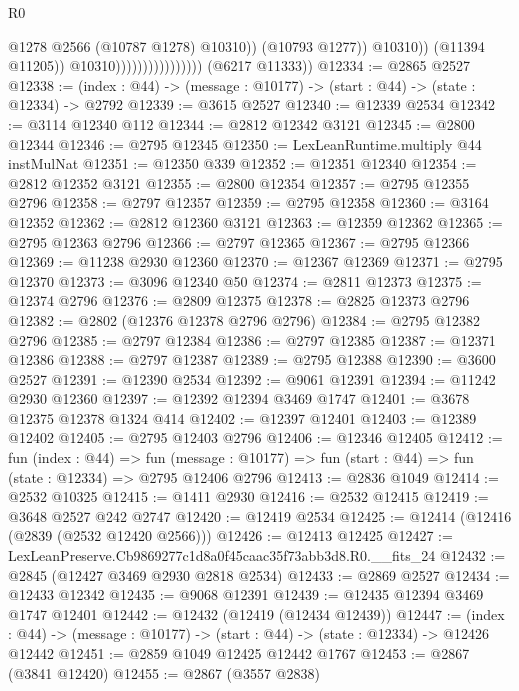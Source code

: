 \begin{lexlean}{R0}
\begin{coremodule}
                                                  @1278
                                                  @2566
                                                  (@10787 @1278)
                                                  @10310))
                                              (@10793 @1277))
                                            @10310))
                                        (@11394 @11205))
                                      @10310))))))))))))))))
      (@6217 @11333))
@12334 := @2865 @2527
@12338 := (index : @44) -> (message : @10177) -> (start : @44) -> (state : @12334) -> @2792
@12339 := @3615 @2527
@12340 := @12339 @2534
@12342 := @3114 @12340 @112
@12344 := @2812 @12342 @3121
@12345 := @2800 @12344
@12346 := @2795 @12345
@12350 := LexLeanRuntime.multiply @44 instMulNat
@12351 := @12350 @339
@12352 := @12351 @12340
@12354 := @2812 @12352 @3121
@12355 := @2800 @12354
@12357 := @2795 @12355 @2796
@12358 := @2797 @12357
@12359 := @2795 @12358
@12360 := @3164 @12352
@12362 := @2812 @12360 @3121
@12363 := @12359 @12362
@12365 := @2795 @12363 @2796
@12366 := @2797 @12365
@12367 := @2795 @12366
@12369 := @11238 @2930 @12360
@12370 := @12367 @12369
@12371 := @2795 @12370
@12373 := @3096 @12340 @50
@12374 := @2811 @12373
@12375 := @12374 @2796
@12376 := @2809 @12375
@12378 := @2825 @12373 @2796
@12382 := @2802 (@12376 @12378 @2796 @2796)
@12384 := @2795 @12382 @2796
@12385 := @2797 @12384
@12386 := @2797 @12385
@12387 := @12371 @12386
@12388 := @2797 @12387
@12389 := @2795 @12388
@12390 := @3600 @2527
@12391 := @12390 @2534
@12392 := @9061 @12391
@12394 := @11242 @2930 @12360
@12397 := @12392 @12394 @3469 @1747
@12401 := @3678 @12375 @12378 @1324 @414
@12402 := @12397 @12401
@12403 := @12389 @12402
@12405 := @2795 @12403 @2796
@12406 := @12346 @12405
@12412 := fun (index : @44) =>
  fun (message : @10177) => fun (start : @44) => fun (state : @12334) => @2795 @12406 @2796
@12413 := @2836 @1049
@12414 := @2532 @10325
@12415 := @1411 @2930
@12416 := @2532 @12415
@12419 := @3648 @2527 @242 @2747
@12420 := @12419 @2534
@12425 := @12414 (@12416 (@2839 (@2532 @12420 @2566)))
@12426 := @12413 @12425
@12427 := LexLeanPreserve.Cb9869277c1d8a0f45caac35f73abb3d8.R0.__fits_24
@12432 := @2845 (@12427 @3469 @2930 @2818 @2534)
@12433 := @2869 @2527
@12434 := @12433 @12342
@12435 := @9068 @12391
@12439 := @12435 @12394 @3469 @1747 @12401
@12442 := @12432 (@12419 (@12434 @12439))
@12447 := (index : @44) -> (message : @10177) -> (start : @44) -> (state : @12334) -> @12426 @12442
@12451 := @2859 @1049 @12425 @12442 @1767
@12453 := @2867 (@3841 @12420)
@12455 := @2867 (@3557 @2838)

\end{coremodule}
\end{lexlean}
